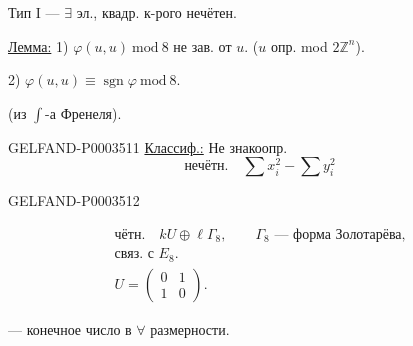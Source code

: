 Тип $\mathrm I$ --- $\exists$ эл., квадр. к-рого нечётен.

\uline{Лемма:} 1) $\varphi(u,u)\ \mathrm{mod}\ 8$ не зав. от $u$.
($u$ опр. mod $2\mathbb Z^n$).

2) $\varphi(u,u)\equiv\operatorname{sgn}\varphi\ \mathrm{mod}\ 8$.

(из $\int$-а Френеля).

\begin{GelfandAdjacentEvidence}{GELFAND-P000351}{1}
\uline{Классиф.:} Не знакоопр.
\begin{equation*}\text{нечётн.}\quad\sum x_i^2-\sum y_i^2\end{equation*}
\end{GelfandAdjacentEvidence}
\begin{GelfandAdjacentEvidence}{GELFAND-P000351}{2}




\end{GelfandAdjacentEvidence}

\begin{gather*}\text{чётн.}\quad kU\oplus\ell\Gamma_8,\qquad\Gamma_8\text{ --- форма Золотарёва,}\\
\text{связ. с }E_8.\\
U=\begin{pmatrix}0&1\\1&0\end{pmatrix}.\end{gather*}

 --- конечное число в $\forall$ размерности.

